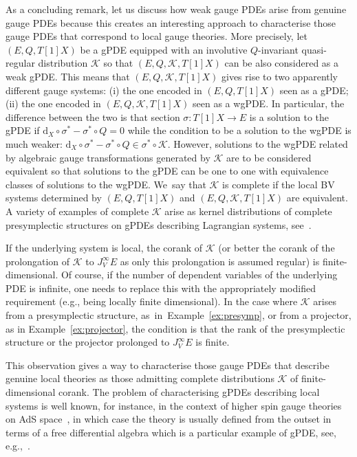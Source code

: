\documentclass[pdftex]{sigma}
\numberwithin{equation}{section}
\theoremstyle{definition}
\newcommand{\dx}{\mathrm{d}_X}
\def\cK{\mathcal{K}}
\begin{document}
As a concluding remark, let us discuss how weak gauge PDEs arise from
genuine gauge PDEs because this creates an interesting approach to characterise those gauge PDEs that correspond to local gauge theories. More precisely, let $(E,Q,T[1]X)$ be a gPDE equipped with an involutive $Q$-invariant quasi-regular distribution $\cK$ so that $(E,Q,\cK,T[1]X)$ can be also considered as a weak gPDE. This means that $(E,Q,\cK,T[1]X)$ gives rise to two apparently different gauge systems: (i) the one encoded in $(E,Q,T[1]X)$ seen as a gPDE; (ii) the one encoded in $(E,Q,\cK,T[1]X)$ seen as a wgPDE. In particular, the difference between the two is that section $\sigma\colon T[1]X\to E$ is a solution to the gPDE if $\dx\circ \sigma^*-\sigma^* \circ Q=0$ while the condition to be a solution to the wgPDE is much weaker: $\dx\circ \sigma^*-\sigma^* \circ Q \in \sigma^* \circ \cK$.
However, solutions to the wgPDE related by algebraic gauge transformations generated by $\cK$ are to be considered equivalent so that solutions to the gPDE can be one to one with equivalence classes of solutions to the wgPDE. We~say that $\cK$ is complete if the local BV systems determined by $(E,Q,T[1]X)$ and $(E,Q,\cK,T[1]X)$ are equivalent. A variety of examples of complete $\cK$ arise as kernel distributions of complete presymplectic structures on gPDEs describing Lagrangian systems, see~\cite{Dneprov:2022jyn,Dneprov:2024cvt, Grigoriev:2016wmk,Grigoriev:2020xec}.

If the underlying system is local, the corank of $\cK$ (or better the corank of the prolongation of $\cK$ to $J^\infty_V E$ as only this prolongation is assumed regular) is finite-dimensional. Of course, if the number of dependent variables of the underlying PDE is infinite, one needs to replace this with the appropriately modified requirement (e.g., being locally finite dimensional). In the case where $\cK$ arises from a presymplectic structure, as~in~Example~\ref{ex:presymp}, or from a projector, as in Example~\ref{ex:projector}, the condition is that the rank of the presymplectic structure or the projector prolonged to $J^\infty_VE$ is finite.

This observation gives a way to characterise those gauge PDEs that describe genuine local theories as those admitting complete distributions $\cK$ of finite-dimensional corank. The problem of characterising gPDEs describing local systems is well known, for instance, in the context of higher spin gauge theories on AdS space~\cite{Vasiliev:1999ba, Vasiliev:2003ev}, in which case the theory is usually defined from the outset in terms of a free differential algebra which is a particular example of gPDE, see, e.g.,~\cite{Boulanger:2015ova,Didenko:2019xzz,Gelfond:2019tac,Skvortsov:2015lja}.
\end{document}
